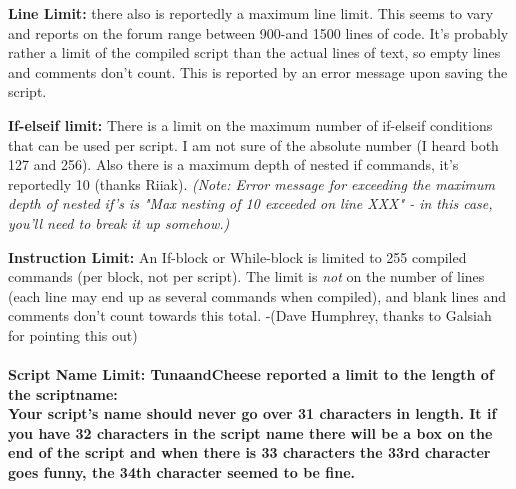 \documentclass[
]{article}
\begin{document}
\textbf{Line Limit:} there also is reportedly a maximum line limit. This
seems to vary and reports on the forum range between 900-and 1500 lines
of code. It's probably rather a limit of the compiled script than the
actual lines of text, so empty lines and comments don't count. This is
reported by an error message upon saving the script.

\textbf{If-elseif limit:} There is a limit on the maximum number of
if-elseif conditions that can be used per script. I am not sure of the
absolute number (I heard both 127 and 256). Also there is a maximum
depth of nested if commands, it's reportedly 10 (thanks Riiak).
\emph{(Note: Error message for exceeding the maximum depth of nested
if's is "Max nesting of 10 exceeded on line XXX" - in this case, you'll
need to break it up somehow.)}

\textbf{Instruction Limit:} An If-block or While-block is limited to 255
compiled commands (per block, not per script). The limit is \emph{not}
on the number of lines (each line may end up as several commands when
compiled), and blank lines and comments don't count towards this total.
-(Dave Humphrey, thanks to Galsiah for pointing this out)

\hypertarget{script-name-limit-tunaandcheese-reported-a-limit-to-the-length-of-the-scriptname-your-scripts-name-should-never-go-over-31-characters-in-length.-it-if-you-have-32-characters-in-the-script-name-there-will-be-a-box-on-the-end-of-the-script-and-when-there-is-33-characters-the-33rd-character-goes-funny-the-34th-character-seemed-to-be-fine.}{%
\paragraph{\texorpdfstring{\textbf{Script Name Limit:} TunaandCheese
reported a limit to the length of the scriptname:\\
Your script's name should never go over 31 characters in length. It if
you have 32 characters in the script name there will be a box on the end
of the script and when there is 33 characters the 33rd character goes
funny, the 34th character seemed to be
fine.}{Script Name Limit: TunaandCheese reported a limit to the length of the scriptname: Your script's name should never go over 31 characters in length. It if you have 32 characters in the script name there will be a box on the end of the script and when there is 33 characters the 33rd character goes funny, the 34th character seemed to be fine.}}\label{script-name-limit-tunaandcheese-reported-a-limit-to-the-length-of-the-scriptname-your-scripts-name-should-never-go-over-31-characters-in-length.-it-if-you-have-32-characters-in-the-script-name-there-will-be-a-box-on-the-end-of-the-script-and-when-there-is-33-characters-the-33rd-character-goes-funny-the-34th-character-seemed-to-be-fine.}}
\end{document}
